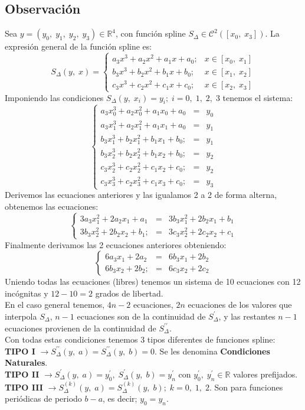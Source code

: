 \documentclass[12pt,a4paper,oneside]{scrbook}
\begin{document}
\subsection*{Observación}
Sea $y=(y_0,\; y_1,\; y_2,\; y_3)\in\mathbb{R}^4$, con función spline $S_\Delta \in\mathcal{C}^2 ([x_0,\; x_3])$. La expresión general de la función spline es:
\[ S_\Delta (y,\; x) = \left\{ 
 \begin{array}{ll}
  a_3x^3+a_2x^2+a_1x+a_0; & x\in [x_0,\; x_1]\\
  b_3x^3+b_2x^2+b_1x+b_0; & x\in [x_1,\; x_2]\\
  c_3x^3+c_2x^2+c_1x+c_0; & x\in [x_2,\; x_3]
 \end{array} \right.
\]
Imponiendo las condiciones $S_\Delta (y,\;x_i)=y_i;\;i=0,\;1,\;2,\;3$ tenemos el sistema:
\[
\left\{ 
 \begin{array}{lcl}
  a_3x_0^3+a_2x_0^2+a_1x_0+a_0 & = & y_0\\
  a_3x_1^3+a_2x_1^2+a_1x_1+a_0 & = & y_1\\
  b_3x_1^3+b_2x_1^2+b_1x_1+b_0; & = & y_1\\
  b_3x_2^3+b_2x_2^2+b_1x_2+b_0; & = & y_2\\
  c_3x_2^3+c_2x_2^2+c_1x_2+c_0; & = & y_2\\
  c_3x_3^3+c_2x_3^2+c_1x_3+c_0; & = & y_3
 \end{array} \right.
\]
Derivemos las ecuaciones anteriores y las igualamos 2 a 2 de forma alterna, obtenemos las ecuaciones:
\[
\left\{ 
 \begin{array}{lcl}
  3a_3x_1^2+2a_2x_1+a_1 & = & 3b_3x_1^2+2b_2x_1+b_1\\
  3b_3x_2^2+2b_2x_2+b_1; & = & 3c_3x_2^2+2c_2x_2+c_1
 \end{array} \right.
\]
Finalmente derivamos las 2 ecuaciones anteriores obteniendo:
\[
\left\{ 
 \begin{array}{lcl}
  6a_3x_1+2a_2 & = & 6b_3x_1+2b_2\\
  6b_3x_2+2b_2; & = & 6c_3x_2+2c_2
 \end{array} \right.
\]
Uniendo todas las ecuaciones (libres) tenemos un sistema de 10 ecuaciones con 12 incógnitas y $12-10=2$ grados de libertad.\\
En el caso general tenemos, $4n-2$ ecuaciones, $2n$ ecuaciones de los valores que interpola $S_\Delta$, $n-1$ ecuaciones son de la continuidad de $S_\Delta ^\prime$, y las restantes $n-1$ ecuaciones provienen de la continuidad de $S_\Delta ^{\prime\prime}$.\\
Con todas estas condiciones tenemos 3 tipos diferentes de funciones spline:\\
\textbf{TIPO I} $\longrightarrow S_\Delta ^{\prime\prime} (y,\; a)=S_\Delta ^{\prime\prime} (y,\; b)=0$. Se les denomina \textbf{Condiciones Naturales}.\\
\textbf{TIPO II} $\longrightarrow S_\Delta ^{\prime} (y,\; a)=y_0^\prime ,\; S_\Delta ^{\prime} (y,\; b)=y_n^\prime$ con $y_0^\prime ,\;y_n^\prime \in\mathbb{R}$ valores prefijados.\\
\textbf{TIPO III} $\longrightarrow S_\Delta ^{(k)} (y,\; a)=S_\Delta ^{(k)} (y,\; b);\;k=0,\;1,\;2$. Son para funciones periódicas de periodo $b-a$, es decir; $y_0=y_n$.
\end{document}
